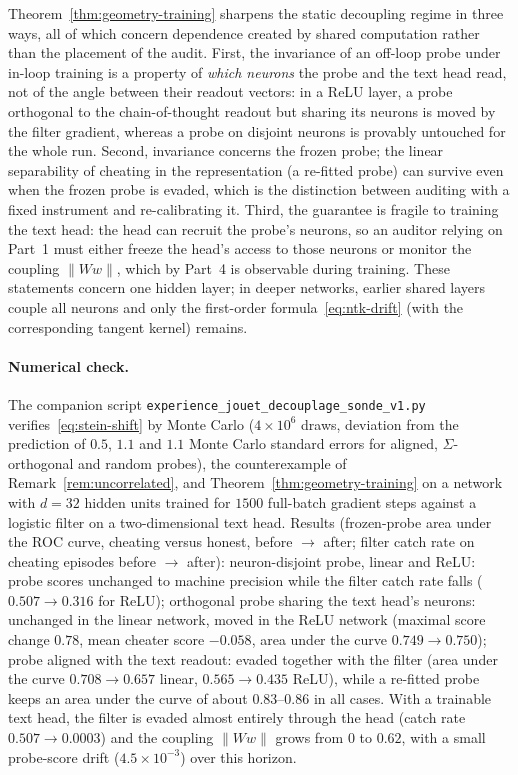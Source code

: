 \begin{remark}
Theorem~\ref{thm:geometry-training} sharpens the static decoupling regime in three ways, all of which concern dependence created by shared computation rather than the placement of the audit. First, the invariance of an off-loop probe under in-loop training is a property of \emph{which neurons} the probe and the text head read, not of the angle between their readout vectors: in a ReLU layer, a probe orthogonal to the chain-of-thought readout but sharing its neurons is moved by the filter gradient, whereas a probe on disjoint neurons is provably untouched for the whole run. Second, invariance concerns the frozen probe; the linear separability of cheating in the representation (a re-fitted probe) can survive even when the frozen probe is evaded, which is the distinction between auditing with a fixed instrument and re-calibrating it. Third, the guarantee is fragile to training the text head: the head can recruit the probe's neurons, so an auditor relying on Part~1 must either freeze the head's access to those neurons or monitor the coupling $\|Ww\|$, which by Part~4 is observable during training. These statements concern one hidden layer; in deeper networks, earlier shared layers couple all neurons and only the first-order formula~\eqref{eq:ntk-drift} (with the corresponding tangent kernel) remains.
\end{remark}

\paragraph{Numerical check.} The companion script \texttt{experience\_jouet\_decouplage\_sonde\_v1.py} verifies~\eqref{eq:stein-shift} by Monte Carlo ($4 \times 10^6$ draws, deviation from the prediction of $0.5$, $1.1$ and $1.1$ Monte Carlo standard errors for aligned, $\Sigma$-orthogonal and random probes), the counterexample of Remark~\ref{rem:uncorrelated}, and Theorem~\ref{thm:geometry-training} on a network with $d = 32$ hidden units trained for $1500$ full-batch gradient steps against a logistic filter on a two-dimensional text head. Results (frozen-probe area under the ROC curve, cheating versus honest, before $\to$ after; filter catch rate on cheating episodes before $\to$ after): neuron-disjoint probe, linear and ReLU: probe scores unchanged to machine precision while the filter catch rate falls ($0.507 \to 0.316$ for ReLU); orthogonal probe sharing the text head's neurons: unchanged in the linear network, moved in the ReLU network (maximal score change $0.78$, mean cheater score $-0.058$, area under the curve $0.749 \to 0.750$); probe aligned with the text readout: evaded together with the filter (area under the curve $0.708 \to 0.657$ linear, $0.565 \to 0.435$ ReLU), while a re-fitted probe keeps an area under the curve of about $0.83$--$0.86$ in all cases. With a trainable text head, the filter is evaded almost entirely through the head (catch rate $0.507 \to 0.0003$) and the coupling $\|Ww\|$ grows from $0$ to $0.62$, with a small probe-score drift ($4.5 \times 10^{-3}$) over this horizon.
